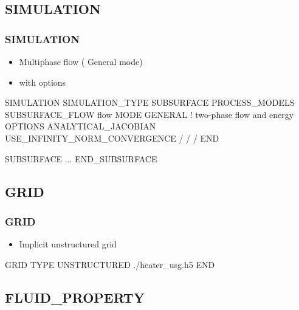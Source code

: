 \documentclass{beamer}
\newcommand\redcomment[1]{{{\color{red} #1}}}
\newcommand\bluecomment[1]{{{\color{blue} #1}}}
\begin{document}
\subsection{SIMULATION}

\begin{frame}[fragile]\frametitle{SIMULATION}

\begin{itemize}
  \item Multiphase flow (\redcomment{General mode})
  \item with \redcomment{options}
\end{itemize}

\begin{semiverbatim}\small
SIMULATION
  SIMULATION_TYPE SUBSURFACE
  PROCESS_MODELS
    SUBSURFACE_FLOW flow
      MODE GENERAL \bluecomment{! two-phase flow and energy}
      OPTIONS
        ANALYTICAL_JACOBIAN
	USE_INFINITY_NORM_CONVERGENCE
      /   
    /   
  /
END

SUBSURFACE
...
END_SUBSURFACE
\end{semiverbatim}

\end{frame}

\subsection{GRID}

\begin{frame}[fragile]\frametitle{GRID}

\begin{itemize}
  \item Implicit \redcomment{unstructured} grid 
\end{itemize}

\begin{semiverbatim}
GRID
  TYPE UNSTRUCTURED ./heater_usg.h5
END
\end{semiverbatim}

\end{frame}

\subsection{FLUID\_PROPERTY}
\end{document}
